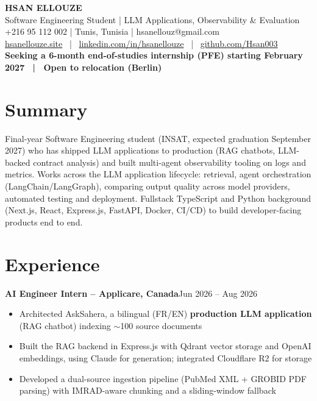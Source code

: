 \documentclass[10pt,a4paper]{article}
\newcommand{\entry}[2]{\vspace{1pt}\noindent\textbf{#1}\hfill{\color{muted}#2}\par}
\begin{document}
\begin{center}
  {\LARGE\bfseries HSAN ELLOUZE}\\[2pt]
  {\color{muted} Software Engineering Student | LLM Applications, Observability \& Evaluation}\\[2pt]
  {\footnotesize +216 95 112 002 | Tunis, Tunisia | hsanellouz@gmail.com}\\[1pt]
  {\footnotesize \href{https://hsanellouze.site}{hsanellouze.site} \ | \ \href{https://linkedin.com/in/hsanellouze}{linkedin.com/in/hsanellouze} \ | \ \href{https://github.com/Hsan003}{github.com/Hsan003}}\\[3pt]
  {\footnotesize\bfseries Seeking a 6-month end-of-studies internship (PFE) starting February 2027 \ | \ Open to relocation (Berlin)}
\end{center}

\section{Summary}
Final-year Software Engineering student (INSAT, expected graduation September 2027) who has shipped LLM applications to production (RAG chatbots, LLM-backed contract analysis) and built multi-agent observability tooling on logs and metrics. Works across the LLM application lifecycle: retrieval, agent orchestration (LangChain/LangGraph), comparing output quality across model providers, automated testing and deployment. Fullstack TypeScript and Python background (Next.js, React, Express.js, FastAPI, Docker, CI/CD) to build developer-facing products end to end.

\section{Experience}
\entry{AI Engineer Intern -- Applicare, Canada}{Jun 2026 -- Aug 2026}
\begin{itemize}
  \item Architected AskSahera, a bilingual (FR/EN) \textbf{production LLM application} (RAG chatbot) indexing $\sim$100 source documents
  \item Built the RAG backend in Express.js with Qdrant vector storage and OpenAI embeddings, using Claude for generation; integrated Cloudflare R2 for storage
  \item Developed a dual-source ingestion pipeline (PubMed XML + GROBID PDF parsing) with IMRAD-aware chunking and a sliding-window fallback
\end{itemize}
\end{document}
